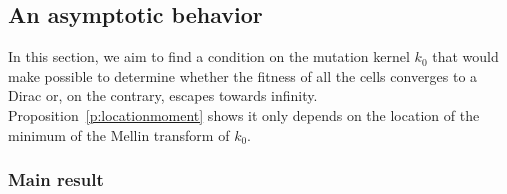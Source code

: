 \documentclass[11pt]{amsart}
\begin{document}
    \subsection{An asymptotic behavior}
    In this section, we aim to find a condition on the mutation kernel $k_0$ that would make possible to determine whether the fitness of all the cells converges to a Dirac or, on the contrary, escapes towards infinity. Proposition~\ref{p:locationmoment} shows it only depends on the location of the minimum of the Mellin transform of $k_0$. 

        \subsubsection{Main result}
\end{document}
